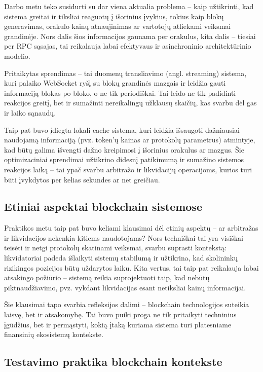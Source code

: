 \documentclass[]{VUMIFTemplateClass}
\begin{document}
Darbo metu teko susidurti su dar viena aktualia problema – kaip užtikrinti, kad sistema greitai ir tiksliai reaguotų į išorinius įvykius, tokius kaip blokų generavimas, orakulo kainų atnaujinimas ar vartotojų atliekami veiksmai grandinėje. Nors dalis šios informacijos gaunama per orakulus, kita dalis – tiesiai per RPC sąsajas, tai reikalauja labai efektyvaus ir asinchroninio architektūrinio modelio.

Pritaikytas sprendimas – tai duomenų transliavimo (angl. streaming) sistema, kuri palaiko WebSocket ryšį su blokų grandinės mazgais ir leidžia gauti informaciją blokas po bloko, o ne tik periodiškai. Tai leido ne tik padidinti reakcijos greitį, bet ir sumažinti nereikalingų užklausų skaičių, kas svarbu dėl gas ir laiko sąnaudų.

Taip pat buvo įdiegta lokali cache sistema, kuri leidžia išsaugoti dažniausiai naudojamą informaciją (pvz. token'ų kainas ar protokolų parametrus) atmintyje, kad būtų galima išvengti dažno kreipimosi į išorinius orakulus ar mazgus. Šie optimizaciniai sprendimai užtikrino didesnį patikimumą ir sumažino sistemos reakcijos laiką – tai ypač svarbu arbitražo ir likvidacijų operacijoms, kurios turi būti įvykdytos per kelias sekundes ar net greičiau.

\subsection{Etiniai aspektai blockchain sistemose}

Praktikos metu taip pat buvo keliami klausimai dėl etinių aspektų – ar arbitražas ir likvidacijos nekenkia kitiems naudotojams? Nors techniškai tai yra visiškai teisėti ir netgi protokolų skatinami veiksmai, svarbu suprasti kontekstą: likvidatoriai padeda išlaikyti sistemų stabilumą ir užtikrina, kad skolininkų rizikingos pozicijos būtų uždarytos laiku. Kita vertus, tai taip pat reikalauja labai atsakingo požiūrio – sistemą reikia suprojektuoti taip, kad nebūtų piktnaudžiavimo, pvz. vykdant likvidacijas esant netiksliai kainų informacijai.

Šie klausimai tapo svarbia refleksijos dalimi – blockchain technologijos suteikia laisvę, bet ir atsakomybę. Tai buvo puiki proga ne tik pritaikyti techninius įgūdžius, bet ir permąstyti, kokią įtaką kuriama sistema turi platesniame finansinių ekosistemų kontekste.

\subsection{Testavimo praktika blockchain kontekste}
\end{document}
